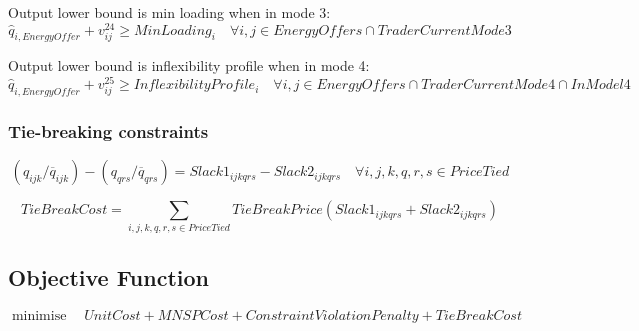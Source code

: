 \documentclass{article}
\DeclareMathOperator*{\minimise}{minimise}
\begin{document}
Output lower bound is min loading when in mode 3:
\begin{equation}
\hat{q}_{i,EnergyOffer} + v_{ij}^{24} \geq MinLoading_{i} \quad \forall i,j \in EnergyOffers \cap TraderCurrentMode3
\end{equation}

Output lower bound is inflexibility profile when in mode 4:
\begin{equation}
\hat{q}_{i,EnergyOffer} + v_{ij}^{25} \geq InflexibilityProfile_{i} \quad \forall i,j \in EnergyOffers \cap TraderCurrentMode4 \cap InModel4
\end{equation}

\subsubsection{Tie-breaking constraints}
%

\begin{equation}
	(q_{ijk} / \overline{q}_{ijk}) - (q_{qrs} / \overline{q}_{qrs}) = Slack1_{ijkqrs} - Slack2_{ijkqrs} \quad \forall i,j,k,q,r,s \in PriceTied
\end{equation}

\begin{equation}
TieBreakCost = \sum\limits_{i,j,k,q,r,s \in PriceTied}	TieBreakPrice(Slack1_{ijkqrs} + Slack2_{ijkqrs})
\end{equation}

\subsection{Objective Function}
\begin{equation}
	\minimise \quad UnitCost + MNSPCost + ConstraintViolationPenalty + TieBreakCost
\end{equation}
\end{document}
